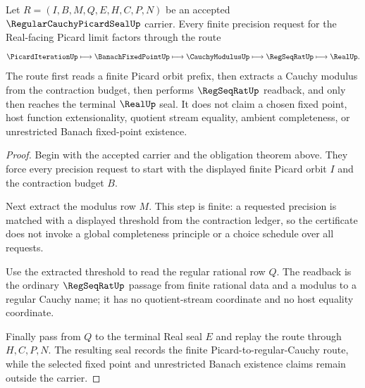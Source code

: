 \begin{theorem}
\label{thm:regular-cauchy-picard-seal-route}
Let $R=(I,B,M,Q,E,H,C,P,N)$ be an accepted $\RegularCauchyPicardSealUp$ carrier. Every finite precision request for the Real-facing Picard limit factors through the route
$$
\PicardIterationUp \longmapsto \BanachFixedPointUp \longmapsto \CauchyModulusUp \longmapsto \RegSeqRatUp \longmapsto \RealUp .
$$
The route first reads a finite Picard orbit prefix, then extracts a Cauchy modulus from the contraction budget, then performs $\RegSeqRatUp$ readback, and only then reaches the terminal $\RealUp$ seal. It does not claim a chosen fixed point, host function extensionality, quotient stream equality, ambient completeness, or unrestricted Banach fixed-point existence.
\end{theorem}
\begin{proof}
Begin with the accepted carrier and the obligation theorem above. They force every precision request to start with the displayed finite Picard orbit $I$ and the contraction budget $B$.

Next extract the modulus row $M$. This step is finite: a requested precision is matched with a displayed threshold from the contraction ledger, so the certificate does not invoke a global completeness principle or a choice schedule over all requests.

Use the extracted threshold to read the regular rational row $Q$. The readback is the ordinary $\RegSeqRatUp$ passage from finite rational data and a modulus to a regular Cauchy name; it has no quotient-stream coordinate and no host equality coordinate.

Finally pass from $Q$ to the terminal Real seal $E$ and replay the route through $H,C,P,N$. The resulting seal records the finite Picard-to-regular-Cauchy route, while the selected fixed point and unrestricted Banach existence claims remain outside the carrier.
\end{proof}

\begin{closurestatus}{\RegularCauchyPicardSealUp}
  \theoryclosure{\seedClosure}
  \formalstatus{\unformalizedV}
\end{closurestatus}
